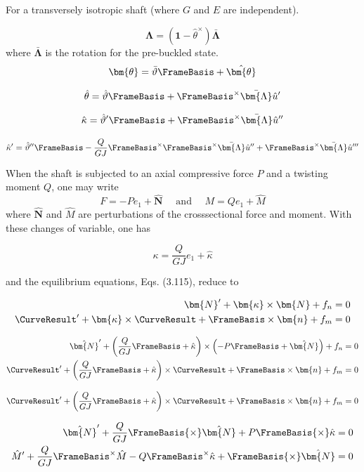 For a transversely isotropic shaft (where $G$ and $E$ are independent).

$$
\bm{\Lambda}=(\bm{1}-\hat{\theta}^{\times}) \bar{\bm{\Lambda}}
$$
%
where $\bar{\bm{\Lambda}}$ is the rotation for the pre-buckled state.
%
$$
\bm{\theta}=\bar{\vartheta} \FrameBasis +\hat{\bm{\theta}}
$$

$$
\hat{\theta}=\hat{\vartheta} \FrameBasis  + \FrameBasis^{\times} \bar{\bm{\Lambda}} \hat{u}^{\prime}
$$

$$
\hat{\kappa}=\hat{\vartheta}^{\prime} \FrameBasis +\FrameBasis^{\times} \bar{\bm{\Lambda}} \hat{u}^{\prime \prime}
$$


$$
\hat{\kappa}^{\prime}=\hat{\vartheta}^{\prime \prime} \FrameBasis  -\frac{Q}{G J} \FrameBasis^{\times} \FrameBasis^{\times} \bar{\bm{\Lambda}} \hat{u}^{\prime \prime}+\FrameBasis^{\times} \bar{\bm{\Lambda}} \hat{u}^{\prime \prime \prime}
$$

When the shaft is subjected to an axial compressive force $P$ and a twisting moment $Q$, one may write 
$$
F=-P e_1+\hat{\bm{N}}
\quad\text{ and }\quad
M=Q e_1+\hat{M}
$$
where $\hat{\bm{N}}$ and $\hat{M}$ are perturbations of the crosssectional force and moment.
With these changes of variable, one has

$$
\kappa=\frac{Q}{G J} e_1+\hat{\kappa}
$$

and the equilibrium equations, Eqs. (3.115), reduce to

$$
\begin{aligned}
\bm{N}^{\prime}+\bm{\kappa} \times \bm{N} + f_n =0 \\
\CurveResult^{\prime}+\bm{\kappa} \times \CurveResult + \FrameBasis  \times \bm{n} + f_{m}=0
\end{aligned}
$$

$$
\begin{aligned}
\hat{\bm{N}}^{\prime}+\left(\frac{Q}{G J} \FrameBasis  +\hat{\kappa}\right) \times \left(-P \FrameBasis  + \hat{\bm{N}}\right) + f_n =0 \\
\CurveResult^{\prime}+\left(\frac{Q}{G J} \FrameBasis  +\hat{\kappa}\right) \times \CurveResult + \FrameBasis  \times \bm{n} + f_{m}=0
\end{aligned}
$$


$$
\begin{aligned}
\CurveResult^{\prime}+\left(\frac{Q}{G J} \FrameBasis  +\hat{\kappa}\right) \times \CurveResult + \FrameBasis  \times \bm{n} + f_{m}=0
\end{aligned}
$$

$$
\begin{aligned}
\hat{\bm{N}}^{\prime}+\frac{Q}{G J} \FrameBasis  {\times} \hat{\bm{N}}+P \FrameBasis  {\times} \hat{\kappa} & =0 \\
\hat{M}^{\prime}+\frac{Q}{G J} \FrameBasis^{\times} \hat{M}-Q \FrameBasis^{\times} \hat{\kappa}+\FrameBasis  {\times} \hat{\bm{N}} & =0
\end{aligned}
$$




